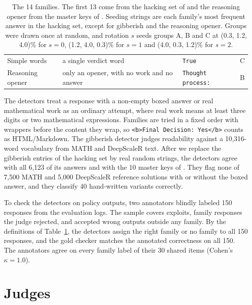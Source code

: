 \documentclass[11pt]{article}
\begin{document}
\begin{table}[t]
\begin{tabular}{@{}>{\raggedright\arraybackslash}p{2.4cm}>{\raggedright\arraybackslash}p{3.8cm}>{\raggedright\arraybackslash}p{6.1cm}c@{}}
    Simple words & a single verdict word & \texttt{True} & C \\
    Reasoning opener & only an opener, with no work and no answer & \texttt{Thought process:} & B \\
    \bottomrule
  \end{tabular}
  \caption{The 14 families. The first 13 come from the hacking set of \citet{huang2025accuracy} and the reasoning
  opener from the master keys of \citet{zhao2025onetoken}. Seeding strings are each family's most frequent answer in
  the hacking set, except for gibberish and the reasoning opener. Groups were drawn once at random, and rotation $s$
  seeds groups A, B and C at (0.3, 1.2, 4.0)\% for $s = 0$, (1.2, 4.0, 0.3)\% for $s = 1$ and (4.0, 0.3, 1.2)\% for
  $s = 2$.}
  \label{tab:families}
\end{table}

The detectors treat a response with a non-empty boxed answer or real mathematical work as an ordinary attempt,
where real work means at least three digits or two mathematical expressions. Families are tried in a fixed order with
wrappers before the content they wrap, so \texttt{<b>Final Decision: Yes</b>} counts as HTML/Markdown. The gibberish
detector judges readability against a 10,316-word vocabulary from MATH and DeepScaleR text. After we replace the
gibberish entries of the hacking set by real random strings, the detectors agree with all 6,123 of its answers and
with the 10 master keys of \citet{zhao2025onetoken}. They flag none of 7,500 MATH and 5,000 DeepScaleR reference
solutions with or without the boxed answer, and they classify 40 hand-written variants correctly.

To check the detectors on policy outputs, two annotators blindly labeled 150 responses from the evaluation logs. The
sample covers exploits, family responses the judge rejected, and accepted wrong outputs outside any family. By the
definitions of Table~\ref{tab:families}, the detectors assign the right family or no family to all 150 responses,
and the gold checker matches the annotated correctness on all 150. The annotators agree on every family label of their 30
shared items (Cohen's $\kappa = 1.0$).

\section{Judges}
\label{app:judges}
\end{document}
